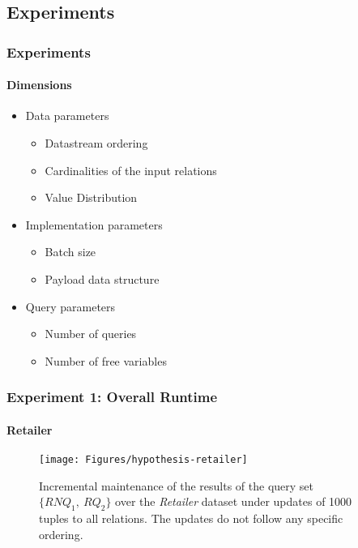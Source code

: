 \documentclass[
	11pt, %
]{beamer}
\begin{document}
\subsection{Experiments}
\begin{frame}
	\frametitle{Experiments}
	\framesubtitle{Dimensions}
	\begin{itemize}
		\item Data parameters
		\begin{itemize}
			\item Datastream ordering
			\item Cardinalities of the input relations
			\item Value Distribution
		\end{itemize}
		\item Implementation parameters
		\begin{itemize}
			\item Batch size
			\item Payload data structure
		\end{itemize}
		\item Query parameters
		\begin{itemize}
			\item Number of queries
			\item Number of free variables
		\end{itemize}
	\end{itemize}
\end{frame}


\begin{frame}
	\frametitle{Experiment 1: Overall Runtime}
	\framesubtitle{Retailer}
	\begin{figure}
		\begin{minipage}{0.25\textwidth}
		\end{minipage}
		\begin{minipage}{0.74\textwidth}
			\texttt{[image: Figures/hypothesis-retailer]} %
		\end{minipage}
		\caption{Incremental maintenance of the results of the query set $\{RNQ_1,\ RQ_2\}$ over the {\em Retailer} dataset under updates of 1000 tuples to all relations. The updates do not follow any specific ordering. }
	\end{figure}
\end{frame}
\end{document}

